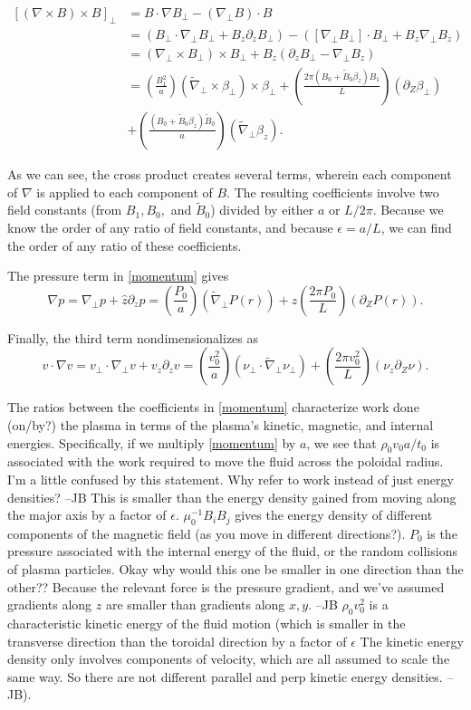 \documentclass{article}
\newcommand{\ep}{\epsilon}
\newcommand{\np}{\nabla_\perp}
\newcommand{\p}{\partial}
\newcommand{\til}[1]{\widetilde{ #1 }}
\newcommand{\pth} [1] {\left( #1 \right) }
\begin{document}
\begin{equation} \begin{split}
    [(\nabla\times B)\times B]_\perp 
    &= B\cdot\nabla B_\perp - (\np B)\cdot B \\
    &= (B_\perp\cdot\np B_\perp + B_z\p_zB_\perp) - ([\np B_\perp]\cdot B_\perp + B_z\np B_z) \\ 
    &= (\np\times B_\perp)\times B_\perp + B_z(\p_zB_\perp - \np B_z) \\ 
    &= \pth{\frac{B_1^2}{a}} \pth{\til{\nabla}_\perp\times\beta_\perp} \times\beta_\perp + \pth{\frac{2\pi \pth{B_0+\til{B}_0\beta_z} B_1}{L}}(\p_Z\beta_\perp) \\ 
    &+ \pth{\frac{\pth{B_0+\til{B}_0\beta_z} \til{B}_0}{a}} \pth{\til{\nabla}_\perp \beta_z}.
\end{split} \end{equation}

As we can see, the cross product creates several terms, wherein each component of $\nabla$ is applied to each component of $B$. The resulting coefficients involve two field constants (from $B_1, B_0,$ and $\til{B}_0$) divided by either $a$ or $L/2\pi$. Because we know the order of any ratio of field constants, and because $\ep=a/L$, we can find the order of any ratio of these coefficients. 

The pressure term in \eqref{momentum} gives
$$\nabla p = \np p + \hat{z}\p_zp = \pth{\frac{P_0}{a}} \pth{\til{\nabla}_\perp P(r)} + \hat{z} \pth{\frac{2\pi P_0}{L}} \pth{\p_ZP(r)}. $$

Finally, the third term nondimensionalizes as 
$$v\cdot\nabla v = v_\perp\cdot \np v + v_z\p_zv = \pth{\frac{v_0^2}{a}} \pth{\nu_\perp \cdot \til{\nabla}_\perp\nu_\perp} + \pth{\frac{2\pi v_0^2}{L}} \pth{\nu_z\p_Z\nu}. $$

The ratios between the coefficients in \eqref{momentum} characterize work done (on/by?) the plasma in terms of the plasma's kinetic, magnetic, and internal energies. Specifically, if we multiply \eqref{momentum} by $a$, we see that 
$\rho_0v_0a/t_0$ is associated with the work required to move the fluid across the poloidal radius. {\color{red}I'm a little confused by this statement. Why refer to work instead of just energy densities? --JB} This is smaller than the energy density gained from moving along the major axis by a factor of $\ep$. 
$\mu_0^{-1}B_iB_j$ gives the energy density of different components of the magnetic field (as you move in different directions?). 
$P_0$ is the pressure associated with the internal energy of the fluid, or the random collisions of plasma particles. Okay why would this one be smaller in one direction than the other?? {\color{red}Because the relevant force is the pressure gradient, and we've assumed gradients along $z$ are smaller than gradients along $x,y$. --JB}
$\rho_0v_0^2$ is a characteristic kinetic energy of the fluid motion (which is smaller in the transverse direction than the toroidal direction by a factor of $\ep$ {\color{red}The kinetic energy density only involves components of velocity, which are all assumed to scale the same way. So there are not different parallel and perp kinetic energy densities. --JB}).  
\end{document}
